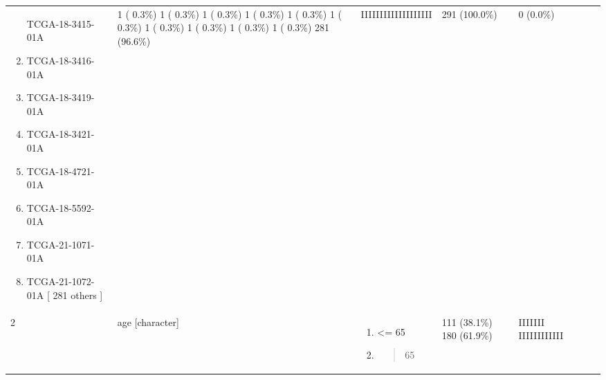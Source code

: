 \documentclass[
]{article}
\begin{document}
\begin{longtable}[]{@{}lllllll@{}}
\begin{minipage}[t]{0.16\columnwidth}
\begin{enumerate}
  TCGA-18-3415-01A
\item
  TCGA-18-3416-01A
\item
  TCGA-18-3419-01A
\item
  TCGA-18-3421-01A
\item
  TCGA-18-4721-01A
\item
  TCGA-18-5592-01A
\item
  TCGA-21-1071-01A
\item
  TCGA-21-1072-01A
  {[} 281 others {]}
\end{enumerate}\strut
\end{minipage} & \begin{minipage}[t]{0.15\columnwidth}\raggedright
1 ( 0.3\%)
1 ( 0.3\%)
1 ( 0.3\%)
1 ( 0.3\%)
1 ( 0.3\%)
1 ( 0.3\%)
1 ( 0.3\%)
1 ( 0.3\%)
1 ( 0.3\%)
1 ( 0.3\%)
281 (96.6\%)\strut
\end{minipage} & \begin{minipage}[t]{0.15\columnwidth}\raggedright
IIIIIIIIIIIIIIIIIII\strut
\end{minipage} & \begin{minipage}[t]{0.08\columnwidth}\raggedright
291
(100.0\%)\strut
\end{minipage} & \begin{minipage}[t]{0.08\columnwidth}\raggedright
0
(0.0\%)\strut
\end{minipage}\tabularnewline
\begin{minipage}[t]{0.03\columnwidth}\raggedright
2\strut
\end{minipage} & \begin{minipage}[t]{0.16\columnwidth}\raggedright
age
{[}character{]}\strut
\end{minipage} & \begin{minipage}[t]{0.16\columnwidth}\raggedright
\begin{enumerate}
\def\labelenumi{\arabic{enumi}.}
\item
  \textless= 65
\item
  \begin{quote}
  65
  \end{quote}
\end{enumerate}\strut
\end{minipage} & \begin{minipage}[t]{0.15\columnwidth}\raggedright
111 (38.1\%)
180 (61.9\%)\strut
\end{minipage} & \begin{minipage}[t]{0.15\columnwidth}\raggedright
IIIIIII
IIIIIIIIIIII\strut
\end{minipage} & \begin{minipage}[t]{0.08\columnwidth}\raggedright

\end{minipage}
\end{longtable}
\end{document}
